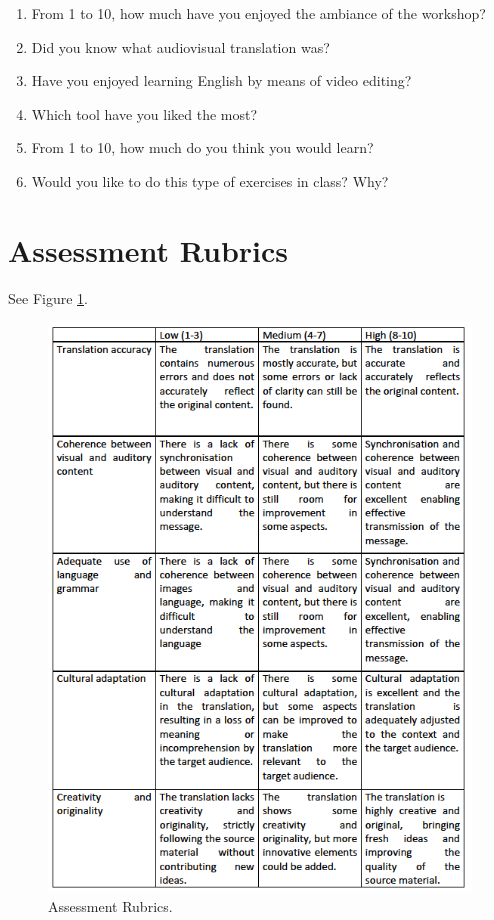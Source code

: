 \documentclass[english]{textolivre}
\begin{document}
\begin{enumerate}
  \item From 1 to 10, how much have you enjoyed the ambiance of the workshop?
  \item Did you know what audiovisual translation was?
  \item Have you enjoyed learning English by means of video editing?
  \item Which tool have you liked the most?
  \item From 1 to 10, how much do you think you would learn?
  \item Would you like to do this type of exercises in class? Why?
\end{enumerate}

\section{Assessment Rubrics}\label{annex-02}

See Figure \ref{fig-annex}.

\begin{figure}[h!]
  \centering
  \includegraphics[width=\textwidth]{figure-annex.png}
  \caption{Assessment Rubrics.}
  \label{fig-annex}
\end{figure}
\end{document}
